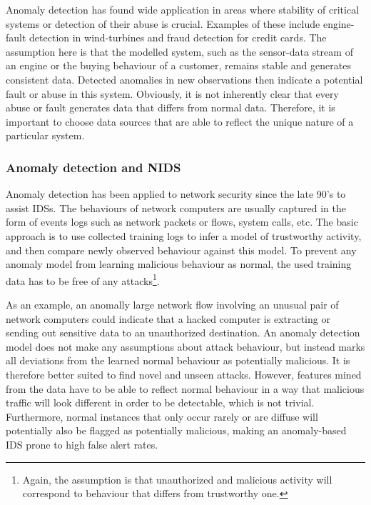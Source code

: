 Anomaly detection has found wide application in areas where stability of  critical systems or detection of their abuse is crucial. Examples of these include engine-fault detection in wind-turbines and fraud detection for credit cards. The assumption here is that the modelled system, such as the sensor-data stream of an engine or the buying behaviour of a customer, remains stable and generates consistent data. Detected anomalies in new observations then indicate a potential fault or abuse in this system. Obviously, it is not inherently clear that every abuse or fault generates data that differs from normal data. Therefore, it is important to choose data sources that are able to reflect the unique nature of a particular system.

\subsubsection{Anomaly detection and NIDS}

Anomaly detection has been applied to network security since the late 90's to assist IDSs. The behaviours of network computers are usually captured in the form of events logs such as network packets or flows, system calls, etc. The basic approach is to use collected training logs to infer a model of trustworthy activity, and then compare newly observed behaviour against this model.  To prevent any anomaly model from learning malicious behaviour as normal, the used training data has to be free of any attacks\footnote{Again, the assumption is that unauthorized and malicious activity will correspond to behaviour that differs from trustworthy one.}. 

As an example, an anomally large network flow involving an unusual pair of network computers could indicate that a hacked computer is extracting or sending out sensitive data to an unauthorized destination. An anomaly detection model does not make any assumptions about attack behaviour, but instead marks all deviations from the learned normal behaviour as potentially malicious. It is therefore better suited to find novel and unseen attacks. However, features mined from the data have to be able to reflect normal behaviour in a way that malicious traffic will look different in order to be detectable, which is not trivial. Furthermore, normal instances that only occur rarely or are diffuse will potentially also be flagged as potentially malicious, making an anomaly-based IDS prone to high false alert rates.


